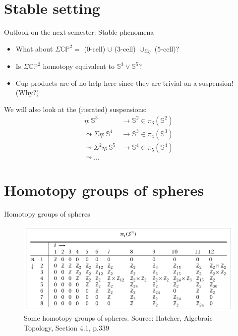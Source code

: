 \documentclass{beamer}
\newcommand{\sphere}[1]{\mathbb{S}^{#1}}
\newcommand{\CP}[1]{\mathbb{CP}^{#1}}
\begin{document}
\section{Stable setting}

\begin{frame}{Outlook on the next semester: Stable phenomena}

	\begin{itemize}
		\item What about $\Sigma \CP{2} = $ ($0$-cell) $\cup$ ($3$-cell) $\cup_{\Sigma \eta}$ ($5$-cell)?
		\pause
		\item Is $\Sigma \CP{2}$ homotopy equivalent to $\sphere{3} \vee \sphere{5}$?
		\pause
		\item Cup products are of no help here since they are trivial
		on a suspension! (Why?)
	\end{itemize}
	
	\pause
	\vfill
	
	\begin{block}{We will also look at the (iterated) suspensions:}
		\begin{align*}
			\eta \colon \sphere{3} & \rightarrow \sphere{2} \in \pi_3(\sphere{2}) \\
			\leadsto \Sigma \eta \colon \sphere{4} & \rightarrow \sphere{3} \in \pi_4(\sphere{3}) \\
			\leadsto \Sigma^{2} \eta \colon \sphere{5} & \rightarrow \sphere{4} \in \pi_5(\sphere{4}) \\
			\leadsto \ldots
		\end{align*}
	\end{block}

\end{frame}

\section{Homotopy groups of spheres}

\begin{frame}{Homotopy groups of spheres}

	\begin{figure}
		\includegraphics[width=\textwidth]{pictures/spheres_homotopy_groups.png}
		\caption{
			\label{fig:spheres_homotopy_groups}
			Some homotopy groups of spheres. \newline
			Source: Hatcher, Algebraic Topology, Section 4.1, p.339}
	\end{figure}

\end{frame}
\end{document}
